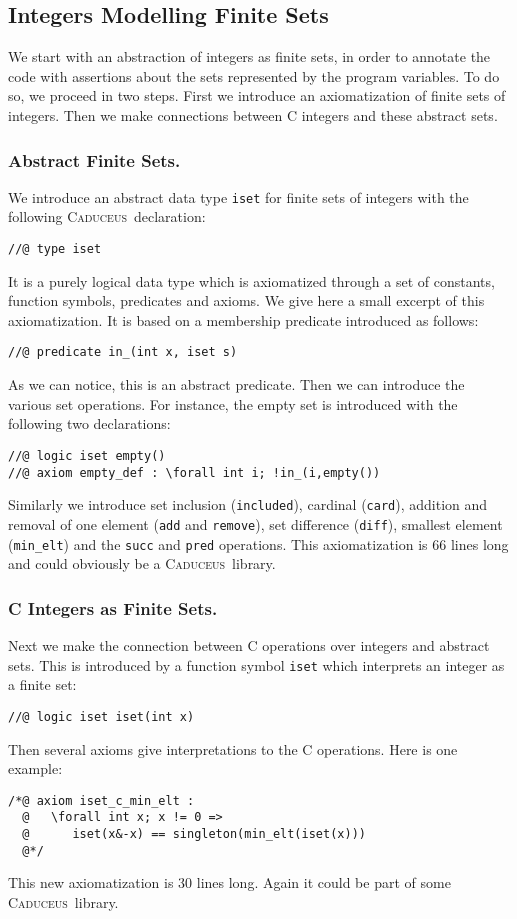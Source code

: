 \documentclass[a4paper]{llncs}
\newcommand{\caduceus}{\textsc{Caduceus}}
\begin{document}
\subsection{Integers Modelling Finite Sets}

We start with an abstraction of integers as finite sets, in order to
annotate the code with assertions about the sets represented by the
program variables. To do so, we proceed in two steps. First we
introduce an axiomatization of finite sets of integers. Then we make
connections between C integers and these abstract sets.

\subsubsection{Abstract Finite Sets.}
We introduce an abstract data type \texttt{iset} for finite sets of
integers with the following \caduceus\ declaration:
\begin{verbatim}
//@ type iset
\end{verbatim}
It is a purely logical data type which is axiomatized through a set of
constants, function symbols, predicates and axioms. We give here a small 
excerpt of this axiomatization. It is based on a
membership predicate  introduced as follows:
\begin{verbatim}
//@ predicate in_(int x, iset s)
\end{verbatim}
As we can notice, this is an abstract predicate. Then we can introduce
the various set operations. For instance, the empty set is introduced
with the following two declarations:
\begin{verbatim}
//@ logic iset empty()
//@ axiom empty_def : \forall int i; !in_(i,empty())
\end{verbatim}
Similarly we introduce set inclusion (\texttt{included}), cardinal
(\texttt{card}), addition and removal
of one element (\texttt{add} and 
\texttt{remove}), set difference (\texttt{diff}), smallest element
(\texttt{min\_elt}) and the \texttt{succ} and \texttt{pred} operations.
This axiomatization is 66 lines long and could obviously be a 
\caduceus\ library.

\subsubsection{C Integers as Finite Sets.}

Next we make the connection between C operations over integers and
abstract sets. This is introduced by a function symbol \texttt{iset}
which interprets an integer as a finite set:
\begin{verbatim}
//@ logic iset iset(int x)
\end{verbatim}
Then several axioms give interpretations to the C operations.
Here is one example:
\begin{verbatim}
/*@ axiom iset_c_min_elt :
  @   \forall int x; x != 0 =>
  @      iset(x&-x) == singleton(min_elt(iset(x)))
  @*/
\end{verbatim}
This new axiomatization is 30 lines long. Again it could be part of some
\caduceus\ library.
\end{document}
